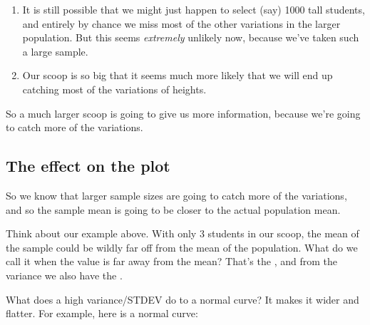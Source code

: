 \documentclass[../../../main.tex]{subfiles}
\begin{document}
\begin{enumerate}
  \begin{enumerate}
  
    \item It is still possible that we might just happen to select (say) 1000 tall students, and entirely by chance we miss most of the other variations in the larger population. But this seems \emph{extremely} unlikely now, because we've taken such a large sample.
    
    \item Our scoop is so big that it seems much more likely that we will end up catching most of the variations of heights.
  
  \end{enumerate}
  
  So a much larger scoop is going to give us more information, because we're going to catch more of the variations.

\end{enumerate}


\subsection{The effect on the plot}

So we know that larger sample sizes are going to catch more of the variations, and so the sample mean is going to be closer to the actual population mean. 

Think about our example above. With only 3 students in our scoop, the mean of the sample could be wildly far off from the mean of the population. What do we call it when the value is far away from the mean? That's the , and from the variance we also have the . 

What does a high variance/STDEV do to a normal curve? It makes it wider and flatter. For example, here is a normal curve:

\begin{center}
\end{center}
\end{document}

